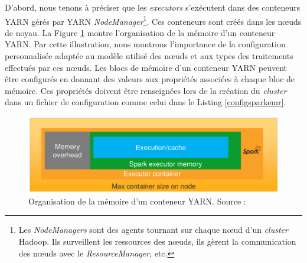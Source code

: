 D'abord, nous tenons à préciser que les \textit{executors} s'exécutent dans des conteneurs YARN gérés par YARN \textit{NodeManager}\footnote{Les \textit{NodeManagers} sont des agents tournant sur chaque n\oe{}ud d'un \textit{cluster} Hadoop. Ils surveillent les ressources des n\oe{}uds, ils gèrent la communication des n\oe{}uds avec le \textit{ResourceManager}, etc.}. Ces conteneurs sont créés dans les n\oe{}uds de noyau. La Figure 	\ref{fig:spark-executoronyarn} montre l'organisation de la mémoire d'un conteneur YARN. Par cette illustration, nous montrons l'importance de la configuration personnalisée adaptée au modèle utilisé  des n\oe{}uds et aux types des traitements effectués par ces n\oe{}uds. 
Les blocs de mémoire d'un conteneur YARN   peuvent être configurés en donnant des valeurs aux propriétés associées à chaque bloc de mémoire. Ces propriétés doivent être renseignées lors de la création du \textit{cluster}  dans un fichier de configuration  comme celui dans le Listing \ref{configsparkemr}.

\begin{figure}[h]
	\centering
	\includegraphics[width=\linewidth]{illustrations/spark-executoronyarn}
	\caption{Organisation de la mémoire d'un conteneur YARN. Source :  \cite{best-practices-emr}}
	\label{fig:spark-executoronyarn}
\end{figure}






